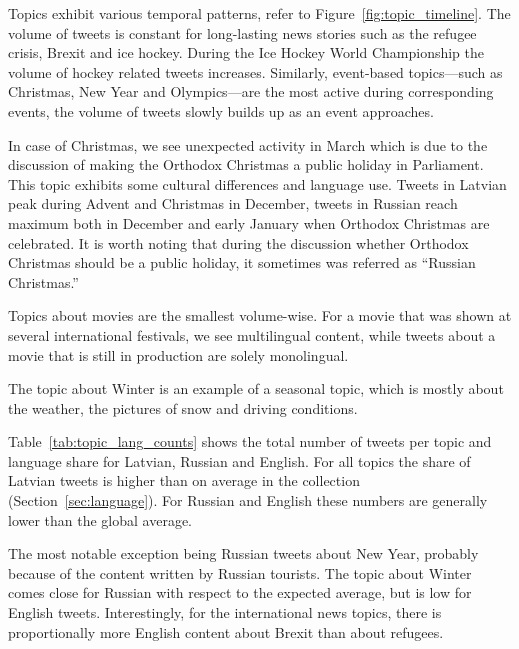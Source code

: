 \documentclass{IOS-Book-Article}
\begin{document}
Topics exhibit various temporal patterns, refer to Figure~\ref{fig:topic_timeline}. The volume of tweets is constant for long-lasting news stories such as the refugee crisis, Brexit and ice hockey.
%
During the Ice Hockey World Championship the volume of hockey related tweets increases. Similarly, event-based topics---such as Christmas, New Year and Olympics---are the most active during corresponding events, the volume of tweets slowly builds up as an event approaches.

In case of Christmas, we see unexpected activity in March which is due to the discussion of making the Orthodox Christmas a public holiday in Parliament. This topic exhibits some cultural differences and language use. Tweets in Latvian peak during Advent and Christmas in December, tweets in Russian reach maximum both in December and early January when Orthodox Christmas are celebrated. It is worth noting that during the discussion whether Orthodox Christmas should be a public holiday, it sometimes was referred as ``Russian Christmas.''

Topics about movies are the smallest volume-wise. For a movie that was shown at several international festivals, we see multilingual content, while tweets about a movie that is still in production are solely monolingual.

The topic about Winter is an example of a seasonal topic, which is mostly about the weather, the pictures of snow and driving conditions.

Table~\ref{tab:topic_lang_counts} shows the total number of tweets per topic and language share for Latvian, Russian and English. For all topics the share of Latvian tweets is higher than on average in the collection (Section~\ref{sec:language}). For Russian and English these numbers are generally lower than the global average.

The most notable exception being Russian tweets about New Year, probably because of the content written by Russian tourists. The topic about Winter comes close for Russian with respect to the expected average, but is low for English tweets. Interestingly, for the international news topics, there is proportionally more English content about Brexit than about refugees.
\end{document}
